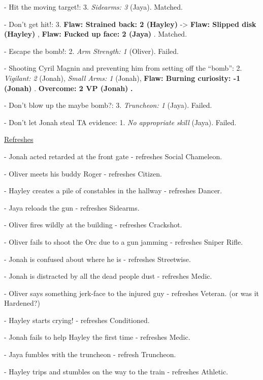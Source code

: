 - Hit the moving target!: 3.  \textit{Sidearms: 3} (Jaya). Matched. 

- Don't get hit!: 3.  \textbf{ {\color[RGB]{255,0,0}Flaw: Strained back: 2 (Hayley)} } -\textgreater  \textbf{ {\color[RGB]{255,0,0}Flaw: Slipped disk (Hayley)} },  \textbf{ {\color[RGB]{255,0,0}Flaw: Fucked up face: 2 (Jaya)} }. Matched. 

- Escape the bomb!: 2.  \textit{Arm Strength: 1} (Oliver).  Failed.

- Shooting Cyril Magnin and preventing him from setting off the ``bomb'': 2. \textit{Vigilant: 2} (Jonah), \textit{Small Arms: 1} (Jonah), \textbf{ {\color[RGB]{255,0,0} Flaw: Burning curiosity: -1 (Jonah)} }.  \textbf{ {\color[RGB]{0,0,255}Overcome: 2 VP (Jonah)} }\textbf{.}

- Don't blow up the maybe bomb?: 3.  \textit{Truncheon: 1} (Jaya). Failed. 

- Don't let Jonah steal TA evidence: 1.  \textit{No appropriate skill} (Jaya).  Failed.



\underline{  {\LARGE Refreshes }  }



- Jonah acted retarded at the front gate - refreshes Social Chameleon.

- Oliver meets his buddy Roger - refreshes Citizen.

- Hayley creates a pile of constables in the hallway - refreshes Dancer.

- Jaya reloads the gun - refreshes Sidearms.

- Oliver fires wildly at the building - refreshes Crackshot.

- Oliver fails to shoot the Orc due to a gun jamming - refreshes Sniper Rifle.

- Jonah is confused about where he is - refreshes Streetwise.

- Jonah is distracted by all the dead people dust - refreshes Medic.

- Oliver says something jerk-face to the injured guy - refreshes Veteran. (or was it Hardened?)

- Hayley starts crying! - refreshes Conditioned.

- Jonah fails to help Hayley the first time - refreshes Medic.

- Jaya fumbles with the truncheon - refresh Truncheon. 

- Hayley trips and stumbles on the way to the train - refreshes Athletic.



